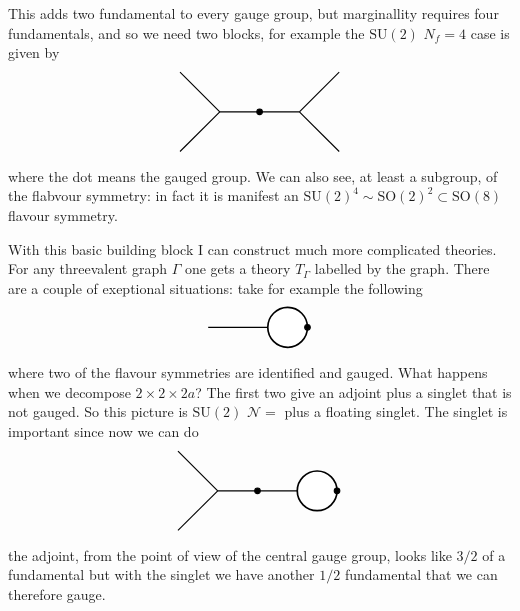 \documentclass[11pt]{article}
\theoremstyle{definition}
\numberwithin{equation}{section}
\newcommand*\cN{\mathcal{N}}
\newcommand*\SU{\mathrm{SU}}
\newcommand*\SO{\mathrm{SO}}
\begin{document}
This adds two fundamental to every gauge group, but marginallity requires four fundamentals, and so we need two blocks, for example the $\SU(2)$ $N_{f}=4$ case is given by
\begin{equation}
\begin{tikzpicture}[thick]
  \draw[-](0,0)--(1,-1);
  \draw[-](1,-1)--(0,-2);
  \draw[-](1,-1)--(2,-1);
  \draw[-](2,-1)--(3,-1);
  \draw[-](3,-1)--(4,0);
  \draw[-](3,-1)--(4,-2);
  \filldraw[black] (2,-1) circle (2pt) node[]{};
\end{tikzpicture}
\end{equation}
where the dot means the gauged group. We can also see, at least a subgroup, of the flabvour symmetry: in fact it is manifest an $\SU(2)^{4}\sim \SO(2)^{2}\subset \SO(8)$ flavour symmetry.

With this basic building block I can construct much more complicated theories. For any threevalent graph $\Gamma$ one gets a theory $T_{\Gamma}$ labelled by the graph. There are a couple of exeptional situations: take for example the following
\begin{equation}
\begin{tikzpicture}[thick]
	\draw[-](0,0)--(1.5,0);
	\filldraw[color=black, fill=white, very thick](2,0) circle (0.5);
 	\filldraw[black] (2.5,0) circle (2pt) node[]{};
\end{tikzpicture}
\label{eq:N4}
\end{equation}
where two of the flavour symmetries are identified and gauged. What happens when we decompose $2\times 2\times 2a$? The first two give an adjoint plus a singlet that is not gauged. So this picture is $\SU(2)$ $\cN=$ plus a floating singlet. The singlet is important since now we can do 
\begin{equation}
\begin{tikzpicture}[thick]
  \draw[-](0,0)--(1,-1);
  \draw[-](1,-1)--(0,-2);
  \draw[-](1,-1)--(2,-1);
  \draw[-](2,-1)--(3,-1);
  \filldraw[color=black, fill=white, very thick](3.5,-1) circle (0.5);
  \filldraw[black] (4,-1) circle (2pt) node[]{};
  \filldraw[black] (2,-1) circle (2pt) node[]{};
\end{tikzpicture}
\end{equation}
the adjoint, from the point of view of the central gauge group, looks like $3/2$ of a fundamental but with the singlet we have another $1/2$ fundamental that we can therefore gauge.
\end{document}
